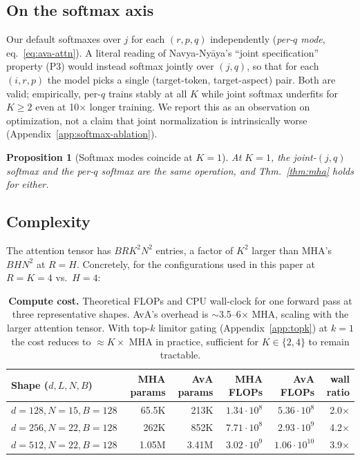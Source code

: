 \documentclass{article}
\newtheorem{proposition}{Proposition}
\begin{document}
\subsection{On the softmax axis}
\label{sec:softmax-mode}

Our default softmaxes over $j$ for each $(r, p, q)$ independently
(\emph{per-$q$ mode}, eq.~\eqref{eq:ava-attn}). A literal reading of
Navya-Ny\=aya's ``joint specification'' property (P3) would instead
softmax jointly over $(j, q)$, so that for each $(i, r, p)$ the model
picks a single (target-token, target-aspect) pair. Both are valid;
empirically, per-$q$ trains stably at all $K$ while joint softmax
underfits for $K \ge 2$ even at 10$\times$ longer training. We report
this as an observation on optimization, not a claim that joint
normalization is intrinsically worse
(Appendix~\ref{app:softmax-ablation}).

\begin{proposition}[Softmax modes coincide at $K=1$]
\label{prop:joint-softmax}
At $K=1$, the joint-$(j, q)$ softmax and the per-$q$ softmax are the
same operation, and Thm.~\ref{thm:mha} holds for either.
\end{proposition}

\subsection{Complexity}
\label{sec:complexity}

The attention tensor has $B R K^2 N^2$ entries, a factor of $K^2$
larger than MHA's $B H N^2$ at $R{=}H$. Concretely, for the
configurations used in this paper at $R{=}K{=}4$ vs.\ $H{=}4$:

\begin{table}[h]
\centering
\caption{\textbf{Compute cost.} Theoretical FLOPs and CPU wall-clock
for one forward pass at three representative shapes. AvA's overhead
is $\sim$3.5--6$\times$ MHA, scaling with the larger attention
tensor. With top-$k$ limitor gating (Appendix~\ref{app:topk}) at
$k{=}1$ the cost reduces to $\approx K\times$ MHA in practice,
sufficient for $K \in \{2, 4\}$ to remain tractable.}
\label{tab:flops}
\small
\begin{tabular}{lrrrrr}
\toprule
Shape ($d, L, N, B$) & MHA params & AvA params &
  MHA FLOPs & AvA FLOPs & wall ratio \\
\midrule
$d{=}128, N{=}15, B{=}128$  & 65.5K  & 213K  & $1.34{\cdot}10^8$ & $5.36{\cdot}10^8$ & 2.0$\times$ \\
$d{=}256, N{=}22, B{=}128$  & 262K   & 852K  & $7.71{\cdot}10^8$ & $2.93{\cdot}10^9$ & 4.2$\times$ \\
$d{=}512, N{=}22, B{=}128$  & 1.05M  & 3.41M & $3.02{\cdot}10^9$ & $1.06{\cdot}10^{10}$ & 3.9$\times$ \\
\bottomrule
\end{tabular}
\end{table}
\end{document}
